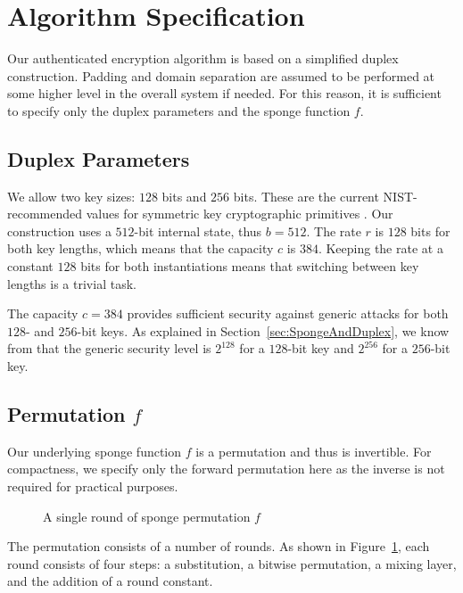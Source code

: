 \section{Algorithm Specification}
\label{sec:AlgorithmSpec}
Our authenticated encryption algorithm is based on a simplified duplex construction.
Padding and domain separation are assumed to be performed at some higher level in the overall system if needed.
For this reason, it is sufficient to specify only the duplex parameters and the sponge function $f$.

\subsection{Duplex Parameters}
We allow two key sizes: $128$ bits and $256$ bits.
These are the current NIST-recommended values for symmetric key cryptographic primitives \cite{NIST2011_KeySizes}.
Our construction uses a $512$-bit internal state, thus $b = 512$.
The rate $r$ is $128$ bits for both key lengths, which means that the capacity $c$ is $384$.
Keeping the rate at a constant $128$ bits for both instantiations means that switching between key lengths is a trivial task.

The capacity $c = 384$ provides sufficient security against generic attacks for both $128$- and $256$-bit keys.
As explained in Section~\ref{sec:SpongeAndDuplex}, we know from \cite{Jovanovic2014_Beyond} that the generic security level is $2^{128}$ for a $128$-bit key and $2^{256}$ for a $256$-bit key.

\subsection{Permutation $f$}
Our underlying sponge function $f$ is a permutation and thus is invertible.
For compactness, we specify only the forward permutation here as the inverse is not required for practical purposes.

\begin{figure}[ht]
\centering

\caption{A single round of sponge permutation $f$}
\label{fig:Round}
\end{figure}

The permutation consists of a number of rounds.
As shown in Figure~\ref{fig:Round}, each round consists of four steps: a substitution, a bitwise permutation, a mixing layer, and the addition of a round constant.

